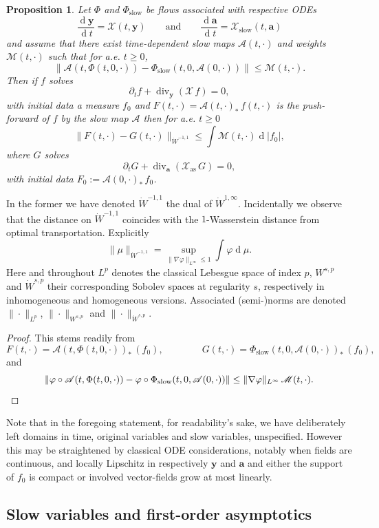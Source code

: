 \documentclass[10pt]{amsart}
\let\mathcal\mathscr
\let\d\partial
\DeclareMathOperator\dD{d}\let\dd\dD
\DeclareMathOperator{\Div}{div}
\theoremstyle{plain}
\newtheorem{proposition}[theorem]{Proposition}
\theoremstyle{definition}
\newcommand{\bpr}{\begin{proposition}}
\newcommand{\epr}{\end{proposition}}
\newcommand\bfa{{\boldsymbol a}}
\newcommand\bfy{{\boldsymbol y}}
\newcommand\cA{{\mathcal A}}
\newcommand\cM{{\mathcal M}}
\newcommand\cX{{\mathcal X}}
\begin{document}
\bpr
\label{p:ODEtoPDE}
Let $\Phi$ and $\Phi_\mathrm{slow}$ be flows associated with respective ODEs
\[
\frac{\dD\bfy}{\dD t}=\cX(t,\bfy)\qquad\textrm{and}\qquad
\frac{\dD\bfa}{\dD t}=\cX_\mathrm{slow}(t,\bfa)
\]
and assume that there exist time-dependent slow maps $\cA(t,\cdot)$ and weights $\cM(t,\cdot)$ such that for a.e. $t\geq0$,
\[
\|\cA(t,\Phi(t,0,\cdot))-\Phi_\mathrm{slow}(t,0,\cA(0,\cdot))\|\leq \cM(t,\cdot).
\]
Then if $f$ solves
\[
\d_t f+\Div_\bfy (\cX\,f)=0,
\]
with initial data a measure $f_0$ and $F(t,\cdot)=\cA(t,\cdot)_*\,f(t,\cdot)$ is the push-forward of $f$ by the slow map $\cA$ then for a.e. $t\geq0$
\[
\|F(t,\cdot)-G(t,\cdot)\|_{\dot{W}^{-1,1}}\leq \int
\cM(t,\cdot) \dD|f_0|,
\]
where $G$ solves
\[
\d_t G +\Div_\bfa (\cX_\mathrm{as} \,G)=0,
\]
with initial data $F_0:=\cA(0,\cdot)_* \,f_0$.
\epr

In the former we have denoted $\dot{W}^{-1,1}$ the dual of $\dot{W}^{1,\infty}$. Incidentally we observe that the distance on $\dot{W}^{-1,1}$ coincides with the $1$-Wasserstein distance from optimal transportation. Explicitly
\[
\|\mu\|_{\dot{W}^{-1,1}}=\sup_{\|\nabla\varphi\|_{L^\infty}\leq
1}\int \varphi\dD \mu.
\]
Here and throughout $L^p$ denotes the classical Lebesgue space of index $p$, $W^{s,p}$ and $\dot{W}^{s,p}$ their corresponding Sobolev spaces at regularity $s$, respectively in inhomogeneous and homogeneous versions. Associated (semi-)norms are denoted $\|\cdot\|_{L^p}$, $\|\cdot\|_{W^{s,p}}$ and $\|\cdot\|_{\dot{W}^{s,p}}$.

\begin{proof}
This stems readily from
\[
F(t,\cdot)=\cA(t,\Phi(t,0,\cdot))_*\,(f_0),\qquad
\qquad
G(t,\cdot)=\Phi_\mathrm{slow}(t,0,\cA(0,\cdot))_*\,(f_0),
\]
and
\[
\|\varphi\circ\cA(t,\Phi(t,0,\cdot))-\varphi\circ \Phi_\mathrm{slow}(t,0,\cA(0,\cdot))\|
\leq \|\nabla\varphi\|_{L^\infty}\,\cM(t,\cdot).\qedhere
\]
\end{proof}

Note that in the foregoing statement, for readability's sake, we have deliberately left domains in time, original variables and slow variables, unspecified. However this may be straightened by classical ODE considerations, notably when fields are continuous, and locally Lipschitz in respectively $\bfy$ and $\bfa$ and either the support of $f_0$ is compact or involved vector-fields grow at most linearly.

\subsection{Slow variables and first-order asymptotics}
\end{document}
